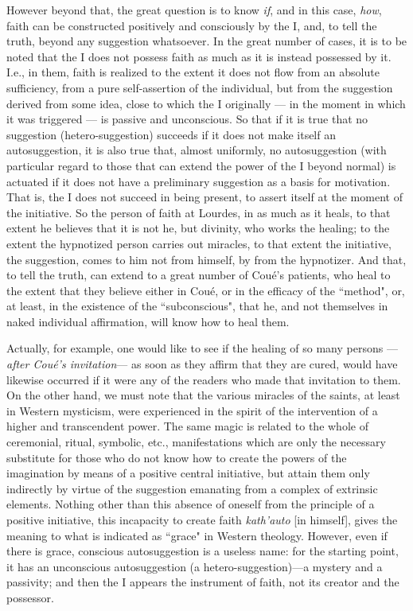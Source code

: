 However beyond that, the great question is to know \textit{if}, and in this case, \textit{how}, faith can be constructed positively and consciously by the I, and, to tell the truth, beyond any suggestion whatsoever. In the great number of cases, it is to be noted that the I does not possess faith as much as it is instead possessed by it. I.e., in them, faith is realized to the extent it does not flow from an absolute sufficiency, from a pure self-assertion of the individual, but from the suggestion derived from some idea, close to which the I originally — in the moment in which it was triggered — is passive and unconscious. So that if it is true that no suggestion (hetero-suggestion) succeeds if it does not make itself an autosuggestion, it is also true that, almost uniformly, no autosuggestion (with particular regard to those that can extend the power of the I beyond normal) is actuated if it does not have a preliminary suggestion as a basis for motivation. That is, the I does not succeed in being present, to assert itself at the moment of the initiative. So the person of faith at Lourdes, in as much as it heals, to that extent he believes that it is not he, but divinity, who works the healing; to the extent the hypnotized person carries out miracles, to that extent the initiative, the suggestion, comes to him not from himself, by from the hypnotizer. And that, to tell the truth, can extend to a great number of Coué's patients, who heal to the extent that they believe either in Coué, or in the efficacy of the ``method", or, at least, in the existence of the ``subconscious", that he, and not themselves in naked individual affirmation, will know how to heal them.

Actually, for example, one would like to see if the healing of so many persons —\textit{after Coué's invitation}— as soon as they affirm that they are cured, would have likewise occurred if it were any of the readers who made that invitation to them. On the other hand, we must note that the various miracles of the saints, at least in Western mysticism, were experienced in the spirit of the intervention of a higher and transcendent power. The same magic is related to the whole of ceremonial, ritual, symbolic, etc., manifestations which are only the necessary substitute for those who do not know how to create the powers of the imagination by means of a positive central initiative, but attain them only indirectly by virtue of the suggestion emanating from a complex of extrinsic elements. Nothing other than this absence of oneself from the principle of a positive initiative, this incapacity to create faith \textit{kath'auto} [in himself], gives the meaning to what is indicated as ``grace" in Western theology. However, even if there is grace, conscious autosuggestion is a useless name: for the starting point, it has an unconscious autosuggestion (a hetero-suggestion)—a mystery and a passivity; and then the I appears the instrument of faith, not its creator and the possessor.

